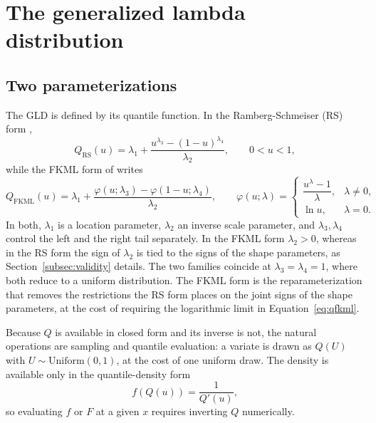 \section{The generalized lambda distribution}\label{sec:background}

\subsection{Two parameterizations}

The GLD is defined by its quantile function. In the Ramberg-Schmeiser (RS)
form \parencite{RambergSchmeiser1974},
\begin{equation}
    Q_{\mathrm{RS}}(u) = \lambda_1 + \frac{u^{\lambda_3} - (1-u)^{\lambda_4}}{\lambda_2},
    \qquad 0 < u < 1,
    \label{eq:qrs}
\end{equation}
while the FKML form of \textcite{FreimerEtAl1988} writes
\begin{equation}
    Q_{\mathrm{FKML}}(u) = \lambda_1 +
    \frac{\varphi(u; \lambda_3) - \varphi(1-u; \lambda_4)}{\lambda_2},
    \qquad
    \varphi(u; \lambda) =
    \begin{cases}
        \dfrac{u^{\lambda} - 1}{\lambda}, & \lambda \neq 0, \\[8pt]
        \ln u,                            & \lambda = 0.
    \end{cases}
    \label{eq:qfkml}
\end{equation}
In both, $\lambda_1$ is a location parameter, $\lambda_2$ an inverse scale
parameter, and $\lambda_3, \lambda_4$ control the left and the right tail
separately. In the FKML form $\lambda_2 > 0$, whereas in the RS form the sign of
$\lambda_2$ is tied to the signs of the shape parameters, as
Section~\ref{subsec:validity} details. The two families coincide at
$\lambda_3 = \lambda_4 = 1$, where both reduce to a uniform distribution. The
FKML form is the reparameterization that removes the restrictions the RS form
places on the joint signs of the shape parameters, at the cost of requiring the
logarithmic limit in Equation~\eqref{eq:qfkml}.

Because $Q$ is available in closed form and its inverse is not, the natural
operations are sampling and quantile evaluation: a variate is drawn as
$Q(U)$ with $U \sim \mathrm{Uniform}(0,1)$, at the cost of one uniform draw. The
density is available only in the quantile-density form
\begin{equation}
    f(Q(u)) = \frac{1}{Q'(u)},
    \label{eq:density}
\end{equation}
so evaluating $f$ or $F$ at a given $x$ requires inverting $Q$ numerically.

